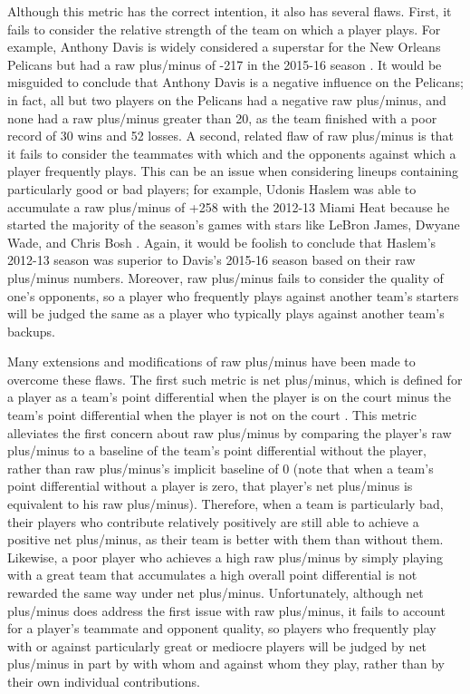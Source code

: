 Although this metric has the correct intention, it also has several flaws. First, it
fails to consider the relative strength of the team on which a player plays. For
example, Anthony Davis is widely considered a superstar for the New Orleans Pelicans
but had a raw plus/minus of -217 in the 2015-16 season \cite{BKRef}. It would be
misguided to conclude that Anthony Davis is a negative influence on the Pelicans; in
fact, all but two players on the Pelicans had a negative raw plus/minus, and none
had a raw plus/minus greater than 20, as the team finished with a poor record of 30
wins and 52 losses. A second, related flaw of raw plus/minus is that it fails to
consider the teammates with which and the opponents against which a player
frequently plays. This can be an issue when considering lineups containing
particularly good or bad players; for example, Udonis Haslem was able to accumulate
a raw plus/minus of +258 with the 2012-13 Miami Heat because he started the majority
of the season's games with stars like LeBron James, Dwyane Wade, and Chris Bosh
\cite{BKRef}. Again, it would be foolish to conclude that Haslem's 2012-13 season
was superior to Davis's 2015-16 season based on their raw plus/minus numbers.
Moreover, raw plus/minus fails to consider the quality of one's opponents, so a
player who frequently plays against another team's starters will be judged the same
as a player who typically plays against another team's backups.

Many extensions and modifications of raw plus/minus have been made to overcome these
flaws. The first such metric is net plus/minus, which is defined for a player as a
team's point differential when the player is on the court minus the team's point
differential when the player is not on the court \cite{Roland}. This metric
alleviates the first concern about raw plus/minus by comparing the player's raw
plus/minus to a baseline of the team's point differential without the player, rather
than raw plus/minus's implicit baseline of 0 (note that when a team's point
differential without a player is zero, that player's net plus/minus is equivalent to
his raw plus/minus).  Therefore, when a team is particularly bad, their players who
contribute relatively positively are still able to achieve a positive net
plus/minus, as their team is better with them than without them. Likewise, a poor
player who achieves a high raw plus/minus by simply playing with a great team that
accumulates a high overall point differential is not rewarded the same way under net
plus/minus. Unfortunately, although net plus/minus does address the first issue with
raw plus/minus, it fails to account for a player's teammate and opponent quality, so
players who frequently play with or against particularly great or mediocre players
will be judged by net plus/minus in part by with whom and against whom they play,
rather than by their own individual contributions.

